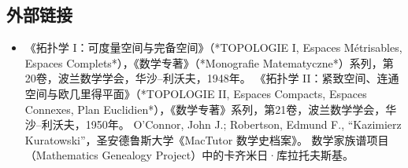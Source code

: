 \subsection{外部链接}
\begin{itemize}
\item 《拓扑学 I：可度量空间与完备空间》（*TOPOLOGIE I, Espaces Métrisables, Espaces Complets*），《数学专著》（*Monografie Matematyczne*）系列，第20卷，波兰数学学会，华沙–利沃夫，1948年。
《拓扑学 II：紧致空间、连通空间与欧几里得平面》（*TOPOLOGIE II, Espaces Compacts, Espaces Connexes, Plan Euclidien*），《数学专著》系列，第21卷，波兰数学学会，华沙–利沃夫，1950年。
O’Connor, John J.; Robertson, Edmund F., “Kazimierz Kuratowski”，圣安德鲁斯大学《MacTutor 数学史档案》。
数学家族谱项目（Mathematics Genealogy Project）中的卡齐米日·库拉托夫斯基。

\end{itemize}